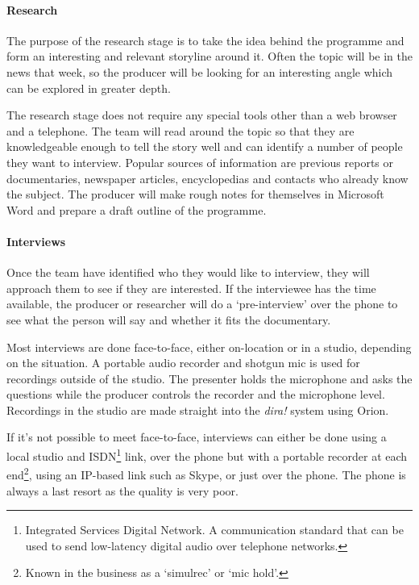 \paragraph{Research}
The purpose of the research stage is to take the idea behind the programme and form an interesting and relevant
storyline around it. Often the topic will be in the news that week, so the producer will be looking for an interesting
angle which can be explored in greater depth.

The research stage does not require any special tools other than a web browser and a telephone. The team will read
around the topic so that they are knowledgeable enough to tell the story well and can identify a number of people they
want to interview. Popular sources of information are previous reports or documentaries, newspaper articles,
encyclopedias and contacts who already know the subject. The producer will make rough notes for themselves in Microsoft
Word and prepare a draft outline of the programme.

\paragraph{Interviews}
Once the team have identified who they would like to interview, they will approach them to see if they are interested.
If the interviewee has the time available, the producer or researcher will do a `pre-interview' over the phone to see
what the person will say and whether it fits the documentary.

Most interviews are done face-to-face, either on-location or in a studio, depending on the situation. A portable audio
recorder and shotgun mic is used for recordings outside of the studio. The presenter holds the microphone and asks the
questions while the producer controls the recorder and the microphone level. Recordings in the studio are made straight
into the \textit{dira!} system using Orion.

If it's not possible to meet face-to-face, interviews can either be done using a local studio and
ISDN\footnote{Integrated Services Digital Network.  A communication standard that can be used to send low-latency
  digital audio over telephone networks.} link, over the phone but with a portable recorder at each end\footnote{Known
  in the business as a `simulrec' or `mic hold'.}, using an IP-based link such as Skype, or just over the phone. The
phone is always a last resort as the quality is very poor.

